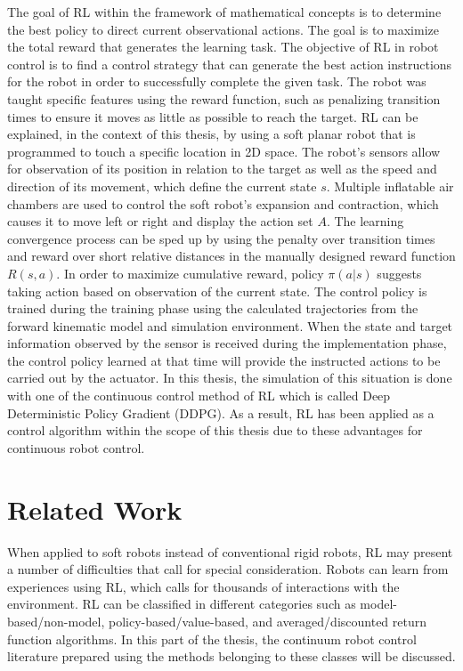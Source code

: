 \documentclass[12pt,twoside,a4]{mwbk}
\begin{document}
The goal of RL within the framework of mathematical concepts is to determine the best policy to direct current observational actions. The goal is to maximize the total reward that generates the learning task. The objective of RL in robot control is to find a control strategy that can generate the best action instructions for the robot in order to successfully complete the given task. The robot was taught specific features using the reward function, such as penalizing transition times to ensure it moves as little as possible to reach the target. RL can be explained, in the context of this thesis, by using a soft planar robot that is programmed to touch a specific location in 2D space. The robot's sensors allow for observation of its position in relation to the target as well as the speed and direction of its movement, which define the current state $s$. Multiple inflatable air chambers are used to control the soft robot's expansion and contraction, which causes it to move left or right and display the action set $A$. The learning convergence process can be sped up by using the penalty over transition times and reward over short relative distances in the manually designed reward function $R(s, a)$. In order to maximize cumulative reward, policy $\pi(a|s)$ suggests taking action based on observation of the current state. The control policy is trained during the training phase using the calculated trajectories from the forward kinematic model and simulation environment. When the state and target information observed by the sensor is received during the implementation phase, the control policy learned at that time will provide the instructed actions to be carried out by the actuator. In this thesis, the simulation of this situation is done with one of the continuous control method of RL which is called Deep Deterministic Policy Gradient (DDPG). As a result, RL has been applied as a control algorithm within the scope of this thesis due to these advantages for continuous robot control.

\section {Related Work}
When applied to soft robots instead of conventional rigid robots, RL may present a number of difficulties that call for special consideration. Robots can learn from experiences using RL, which calls for thousands of interactions with the environment. RL can be classified in different categories such as model-based/non-model, policy-based/value-based, and averaged/discounted return function algorithms. In this part of the thesis, the continuum robot control literature prepared using the methods belonging to these classes will be discussed.
\end{document}
